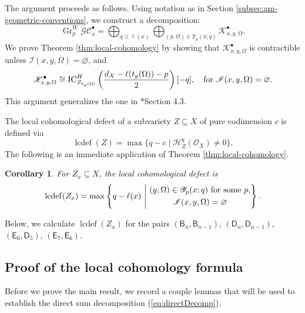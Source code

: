 \documentclass[12pt]{amsart}
\newtheorem{cor}[theorem]{Corollary}
\theoremstyle{definition}
\numberwithin{equation}{section}
\begin{document}
\noindent The argument proceeds as follows. Using notation as in Section \ref{subsec:am-geometric-conventions}, we construct a decomposition:
\begin{equation}\label{eq:directDecomp}
\operatorname{Gr}^W_p\mathscr{GC}_x^{\bullet}    =\bigoplus_{q\geq \ell(x)}\bigoplus_{(y,\Omega)\in \mathscr{Y}_p(x;q)} \mathscr{K}_{x,y,\Omega}^{\bullet}.
\end{equation}
We prove Theorem \ref{thm:local-cohomology} by showing that $\mathscr{K}_{x,y,\Omega}^{\bullet}$ is contractible unless $\mathscr I(x,y,\Omega)=\varnothing$, and 
\begin{equation}
\mathscr{K}_{x,y,\Omega}^{\bullet}\cong \operatorname{IC}_{Z_{t_y(\Omega)}}^H
\left(\frac{d_X-\ell(t_y(\Omega))-p}{2}\right)[-q],\quad \textnormal{for $\mathscr I(x,y,\Omega)=\varnothing$.}    
\end{equation}
This argument generalizes the one in \cite{schubertLC}*{Section 4.3}.

The local cohomological defect of a subvariety $Z\subseteq X$ of pure codimension $c$ is defined via
\begin{equation}
\operatorname{lcdef}(Z)=\max\{q-c\mid \mathscr{H}^q_Z(\mathscr{O}_X)\neq 0\}.
\end{equation}
The following is an immediate application of Theorem \ref{thm:local-cohomology}.

\begin{cor}
For $Z_x\subseteq X$, the local cohomological defect is 
\[
\operatorname{lcdef}(Z_x)
=\max\left\{
q-\ell(x)\ \middle|\
\begin{gathered}
(y,\Omega)\in\mathscr Y_p(x;q)
\textnormal{ for some }p,\\
\mathscr I(x,y,\Omega)=\varnothing
\end{gathered}
\right\}.
\]
\end{cor}
\noindent Below, we calculate $\operatorname{lcdef}(Z_x)$ for the pairs $(\mathsf{B}_n,\mathsf{B}_{n-1})$, $(\mathsf{D}_n,\mathsf{D}_{n-1})$, $(\mathsf{E}_6,\mathsf{D}_5)$, $(\mathsf{E}_7,\mathsf{E}_6)$.


\subsection{Proof of the local cohomology formula} Before we prove the main result, we record a couple lemmas that will be used to establish the direct sum decomposition (\ref{eq:directDecomp}).
\end{document}
